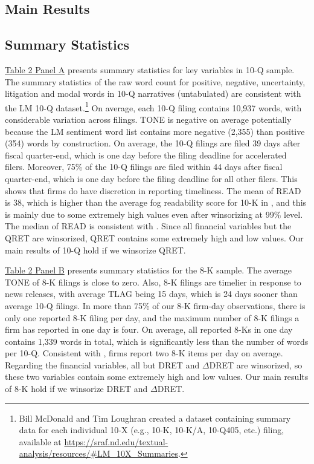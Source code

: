 \documentclass[letterpaper,11pt]{article}
\begin{document}
\begin{spacing}{1.5}
\section{Main Results}
\subsection{Summary Statistics}
\noindent \hyperref[T2PA]{Table 2 Panel A} presents summary statistics for key variables in 10-Q sample. The summary statistics of the raw word count for positive, negative, uncertainty, litigation and modal words in 10-Q narratives (untabulated) are consistent with the LM 10-Q dataset.\footnote{Bill McDonald and Tim Loughran created a dataset containing summary data for each individual 10-X (e.g., 10-K, 10-K/A, 10-Q405, etc.) filing, available at \url{https://sraf.nd.edu/textual-analysis/resources/\#LM_10X_Summaries}.} On average, each 10-Q filing contains 10,937 words, with considerable variation across filings. TONE is negative on average potentially because the LM sentiment word list contains more negative (2,355) than positive (354) words by construction. On average, the 10-Q filings are filed 39 days after fiscal quarter-end, which is one day before the filing deadline for accelerated filers. Moreover, 75\% of the 10-Q filings are filed within 44 days after fiscal quarter-end, which is one day before the filing deadline for all other filers. This shows that firms do have discretion in reporting timeliness. The mean of READ is 38, which is higher than the average fog readability score for 10-K in , and this is mainly due to some extremely high values even after winsorizing at 99\% level. The median of READ is consistent with . Since all financial variables but the QRET are winsorized, QRET contains some extremely high and low values. Our main results of 10-Q hold if we winsorize QRET.

\hyperref[T2PB]{Table 2 Panel B} presents summary statistics for the 8-K sample. The average TONE of 8-K filings is close to zero. Also, 8-K filings are timelier in response to news releases, with average TLAG being 15 days, which is 24 days sooner than average 10-Q filings. In more than 75\% of our 8-K firm-day observations, there is only one reported 8-K filing per day, and the maximum number of 8-K filings a firm has reported in one day is four. On average, all reported 8-Ks in one day contains 1,339 words in total, which is significantly less than the number of words per 10-Q. Consistent with , firms report two 8-K items per day on average. Regarding the financial variables, all but DRET and $\Delta$DRET are winsorized, so these two variables contain some extremely high and low values. Our main results of 8-K hold if we winsorize DRET and $\Delta$DRET.


\end{spacing}
\end{document}
